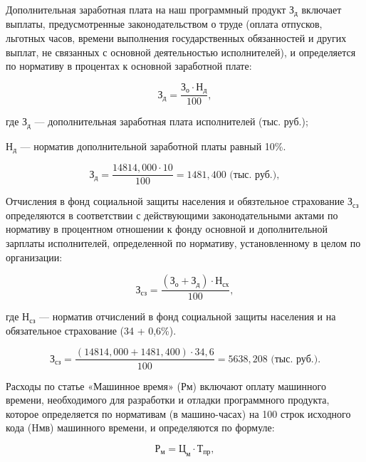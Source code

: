 Дополнительная заработная плата на наш программный продукт \( \text{З}_{\text{д}} \) включает выплаты, предусмотренные законодательством о труде (оплата отпусков, льготных часов, времени выполнения государственных обязанностей и других выплат, не связанных с основной деятельностью исполнителей), и определяется по нормативу в процентах к основной заработной плате:

\begin{displaymath}
  \text{З}_{\text{д}} = \frac{ \text{З}_{\text{о}} \cdot \text{Н}_{\text{д}} } { 100 },
\end{displaymath}

где \(\text{З}_{\text{д}}\) --- дополнительная заработная плата исполнителей (тыс. руб.);
 
\(\text{Н}_{\text{д}}\) --- норматив дополнительной заработной платы равный 10\%.

\begin{displaymath}
  \text{З}_{\text{д}} = \frac{ 14814,000 \cdot 10 } { 100 } = 1481,400 \text{ (тыс. руб.)},
\end{displaymath}

Отчисления в фонд социальной защиты населения и обязтельное страхование \( \text{З}_{\text{сз}} \) определяются в соответствии с действующими законодательными актами по нормативу в процентном отношении к фонду основной и дополнительной зарплаты исполнителей, определенной по нормативу, установленному в целом по организации:

\begin{displaymath}
  \text{З}_{\text{сз}} = \frac{ (\text{З}_{\text{о}} + \text{З}_{\text{д}}) \cdot \text{Н}_{\text{сх}}  } { 100},
\end{displaymath}

где \(\text{Н}_{\text{сз}}\) --- норматив отчислений в фонд социальной защиты населения  и на обязательное страхование (34 + 0,6\%).

\begin{displaymath}
  \text{З}_{\text{сз}} = \frac{ (14814,000 + 1481,400) \cdot 34,6  } { 100 } = 5638,208 \text{ (тыс. руб.)}.
\end{displaymath}

Расходы по статье «Машинное время» (Рм) включают оплату машинного времени, необходимого для разработки и отладки программного продукта, которое определяется по нормативам (в машино-часах) на 100 строк исходного кода (Hмв) машинного времени, и определяются по формуле:

\begin{displaymath}
  \text{Р}_{\text{м}} = \text{Ц}_{\text{м}} \cdot \text{Т}_{\text{пр}},
\end{displaymath}

